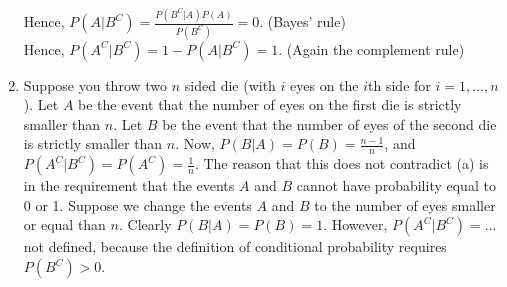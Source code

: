 \begin{exercise}[BH.2.12]
\begin{solution}
\begin{enumerate}
		Hence, $P(A|B^C) = \frac{P(B^{C}|A)P(A)}{P(B^{C})} = 0$. (Bayes' rule)\\
		Hence, $P(A^{C}|B^{C}) = 1-P(A|B^{C}) = 1$. (Again the complement rule)
		\item  Suppose you throw two $n$ sided die (with $i$ eyes on the $i$th side for $i=1,\ldots,n$). Let $A$ be the event that the number of eyes on the first die is strictly smaller than $n$. Let $B$ be the event that the number of eyes of the second die is strictly smaller than $n$. Now, $P(B|A)=P(B) = \frac{n-1}{n}$, and $P(A^{C}|B^{C})=P(A^{C})=\frac{1}{n}$. The reason that this does not contradict (a) is in the requirement that the events $A$ and $B$ cannot have probability equal to 0 or 1. Suppose we change the events $A$ and $B$ to the number of eyes smaller or equal than $n$. Clearly $P(B|A)=P(B)=1$. However, $P(A^{C}|B^{C})=...$ not defined, because the definition of conditional probability requires $P(B^C)>0$. 
	\end{enumerate}
\end{solution}
\end{exercise}

